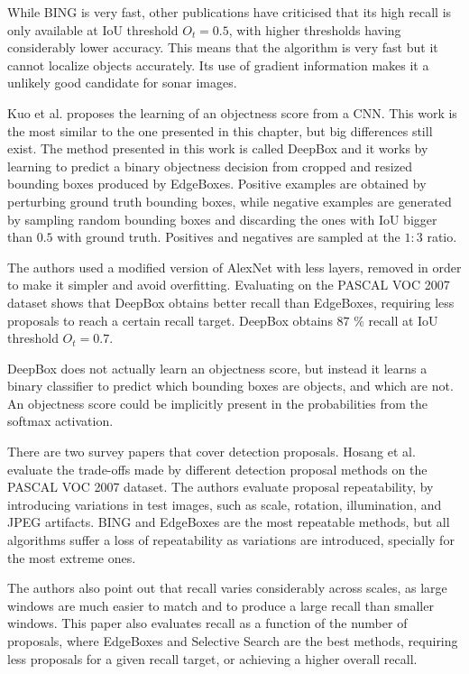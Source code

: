While BING is very fast, other publications \cite{hosang2016makes} have criticised that its high recall is only available at IoU threshold $O_t = 0.5$, with higher thresholds having considerably lower accuracy. This means that the algorithm is very fast but it cannot localize objects accurately. Its use of gradient information makes it a unlikely good candidate for sonar images.

Kuo et al. \cite{kuo2015deepbox} proposes the learning of an objectness score from a CNN. This work is the most similar to the one presented in this chapter, but big differences still exist. The method presented in this work is called DeepBox and it works by learning to predict a binary objectness decision from cropped and resized bounding boxes produced by EdgeBoxes.
Positive examples are obtained by perturbing ground truth bounding boxes, while negative examples are generated by sampling random bounding boxes and discarding the ones with IoU bigger than $0.5$ with ground truth. Positives and negatives are sampled at the $1:3$ ratio.

The authors used a modified version of AlexNet with less layers, removed in order to make it simpler and avoid overfitting. Evaluating on the PASCAL VOC 2007 dataset shows that DeepBox obtains better recall than EdgeBoxes, requiring less proposals to reach a certain recall target. DeepBox obtains $87$ \% recall at IoU threshold $O_t = 0.7$.

DeepBox does not actually learn an objectness score, but instead it learns a binary classifier to predict which bounding boxes are objects, and which are not. An objectness score could be implicitly present in the probabilities from the softmax activation.

There are two survey papers that cover detection proposals. Hosang et al. \cite{hosang2014good} evaluate the trade-offs made by different detection proposal methods on the PASCAL VOC 2007 dataset. The authors evaluate proposal repeatability, by introducing variations in test images, such as scale, rotation, illumination, and JPEG artifacts. BING and EdgeBoxes are the most repeatable methods, but all algorithms suffer a loss of repeatability as variations are introduced, specially for the most extreme ones.

The authors also point out that recall varies considerably across scales, as large windows are much easier to match and to produce a large recall than smaller windows. This paper also evaluates recall as a function of the number of proposals, where EdgeBoxes and Selective Search are the best methods, requiring less proposals for a given recall target, or achieving a higher overall recall.


